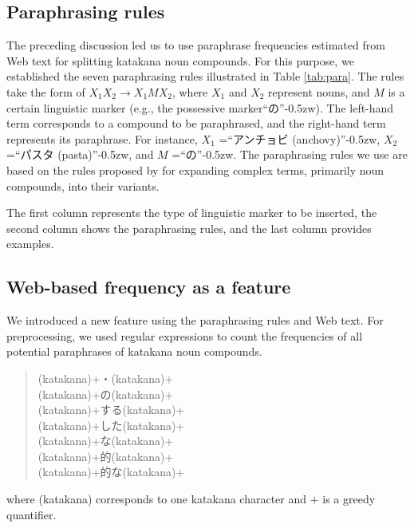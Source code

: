 \documentclass[english]{jnlp_1.4_rep}
\begin{document}
\subsection{Paraphrasing rules}

The preceding discussion led us to use paraphrase frequencies estimated
from Web text for splitting katakana noun compounds. For this purpose, we
established the seven paraphrasing rules illustrated in Table
\ref{tab:para}. The rules take the form of $X_1X_2\rightarrow
X_1MX_2$, where $X_1$ and $X_2$ represent nouns, and $M$ is a certain
linguistic marker (e.g., the possessive marker“の”{\kern-0.5zw}). The left-hand
term corresponds to a compound to be paraphrased, and the right-hand term
represents its paraphrase. For instance, $X_1$ =“アンチョビ
(anchovy)”{\kern-0.5zw}, $X_2$ =“パスタ (pasta)”{\kern-0.5zw}, and $M$ =“の”{\kern-0.5zw}. The paraphrasing
rules we use are based on the rules proposed by \cite{Kageura04} for expanding complex terms, primarily noun
compounds, into their variants.

\begin{table}[b]
   \label{tab:para}

\vspace{4pt}\small
 The first column represents
   the type of linguistic marker to be inserted, the second column shows
   the paraphrasing rules, and the last column provides examples.\par
\end{table}


\subsection{Web-based frequency as a feature}

We introduced a new feature using the paraphrasing rules and Web text. For
preprocessing, we used regular expressions to count the frequencies of
all potential paraphrases of katakana noun compounds.
\begin{quote}
 (katakana)+\;・\;(katakana)+ \\
 (katakana)+\;の\;(katakana)+ \\
 (katakana)+\;する\;(katakana)+ \\
 (katakana)+\;した\;(katakana)+ \\
 (katakana)+\;な\;(katakana)+ \\
 (katakana)+\;的\;(katakana)+ \\
 (katakana)+\;的な\;(katakana)+ 
\end{quote}
where (katakana) corresponds to one katakana character and $+$ is a
greedy quantifier.
\end{document}
